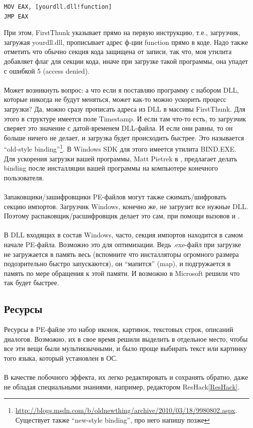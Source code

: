 \begin{lstlisting}
MOV EAX, [yourdll.dll!function]
JMP EAX
\end{lstlisting}

При этом, FirstThunk указывает прямо на первую инструкцию, т.е., загрузчик, загружая yourdll.dll, прописывает адрес
ф-ции function прямо в коде. Надо также отметить что обычно секция кода защищена от записи, так что, моя утилита
добавляет флаг  для секции кода, иначе при загрузке такой программы, она упадет с
ошибкой 5 (access denied). \\
\\
Может возникнуть вопрос: а что если я поставляю программу с набором DLL, которые никогда не будут меняться,
может как-то можно ускорить процесс загрузки? Да, можно сразу прописать адреса из DLL в массивы FirstThunk.
Для этого в структуре  имеется поле Timestamp. И если там что-то есть, то загрузчик
сверяет это значение с датой-временем DLL-файла. И если они равны, то он больше ничего не делает, и загрузка будет
происходить быстрее. 
Это называется ``old-style binding''\footnote{\url{http://blogs.msdn.com/b/oldnewthing/archive/2010/03/18/9980802.aspx}. Существует также ``new-style binding'', про него напишу позже}.
В Windows SDK для этого имеется утилита BIND.EXE.
Для ускорения загрузки вашей программы, Matt Pietrek в \cite{Pietrek1}, предлагает делать binding после инсталляции
вашей программы на компьютере конечного пользователя. \\
\\
Запаковщики/зашифровщики PE-файлов могут также сжимать/шифровать секцию импортов. Загрузчик Windows,
конечно же, не загрузит все нужные DLL. Поэтому распаковщик/расшифровщик делает это сам, при помощи
вызовов  и . \\
\\
В DLL входящих в состав Windows, часто, секция импортов находится в самом начале PE-файла.
Возможно это для оптимизации.
Ведь .exe-файл при загрузке не загружается в память весь (вспомните что инсталляторы огромного размера подозрительно
быстро запускаются), он ``мапится'' (map), и подгружается в память по мере
обращения к этой памяти. И возможно в Microsoft решили что так будет быстрее.

\subsection{Ресурсы}

Ресурсы в PE-файле это набор иконок, картинок, текстовых строк, описаний диалогов.
Возможно, их в свое время решили выделить в отдельное место, чтобы все эти вещи были мультиязычными,
и было проще выбирать текст или картинку того языка, который установлен в ОС. \\
\\
В качестве побочного эффекта, их легко редактировать и сохранять обратно, даже не обладая специальными знаниями,
например, редактором ResHack\ref{ResHack}.

